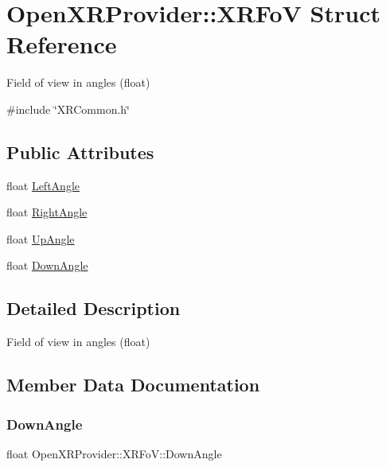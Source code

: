 \hypertarget{struct_open_x_r_provider_1_1_x_r_fo_v}{}\section{Open\+X\+R\+Provider\+::X\+R\+FoV Struct Reference}
\label{struct_open_x_r_provider_1_1_x_r_fo_v}


Field of view in angles (float)  




{\ttfamily \#include \char`\"{}X\+R\+Common.\+h\char`\"{}}

\subsection*{Public Attributes}
\begin{DoxyCompactItemize}
\item 
float \mbox{\hyperlink{struct_open_x_r_provider_1_1_x_r_fo_v_aed03c0087fca307c5ef7477d1526e31d}{Left\+Angle}}
\item 
float \mbox{\hyperlink{struct_open_x_r_provider_1_1_x_r_fo_v_ab39e0b3bfc04f07935fac2124f876004}{Right\+Angle}}
\item 
float \mbox{\hyperlink{struct_open_x_r_provider_1_1_x_r_fo_v_a129c62898a5880df4047e4ce250b1ee6}{Up\+Angle}}
\item 
float \mbox{\hyperlink{struct_open_x_r_provider_1_1_x_r_fo_v_ac47671f76b1ca147b8081c8e863a9e98}{Down\+Angle}}
\end{DoxyCompactItemize}


\subsection{Detailed Description}
Field of view in angles (float) 

\subsection{Member Data Documentation}
\mbox{\label{struct_open_x_r_provider_1_1_x_r_fo_v_ac47671f76b1ca147b8081c8e863a9e98}} 
\subsubsection{\texorpdfstring{DownAngle}{DownAngle}}
{\footnotesize\ttfamily float Open\+X\+R\+Provider\+::\+X\+R\+Fo\+V\+::\+Down\+Angle}

